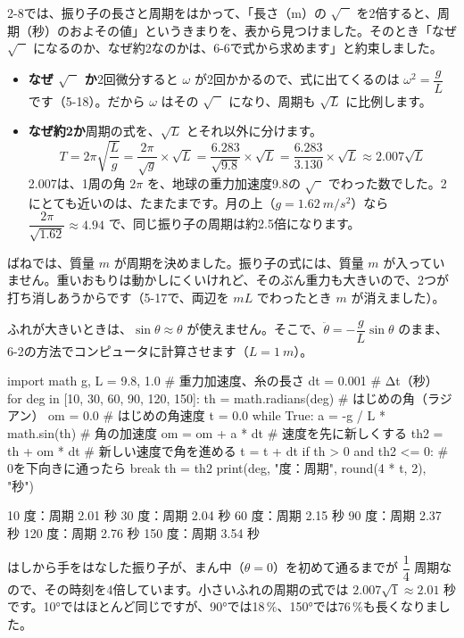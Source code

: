 2-8では、振り子の長さと周期をはかって、「長さ（m）の $\sqrt{\phantom{L}}$ を2倍すると、周期（秒）のおよその値」というきまりを、表から見つけました。そのとき「なぜ $\sqrt{\phantom{L}}$ になるのか、なぜ約2なのかは、6-6で式から求めます」と約束しました。
\begin{itemize}[leftmargin=1.2\zw, itemsep=2pt, topsep=2pt, label={\color{\bkTT}●}]
\item \textbf{なぜ $\sqrt{\phantom{L}}$ か}\quad 2回微分すると $\omega$ が2回かかるので、式に出てくるのは \mbox{$\omega^2=\dfrac{g}{L}$} です（5-18）。だから $\omega$ はその $\sqrt{\phantom{L}}$ になり、周期も $\sqrt{L}$ に比例します。
\item \textbf{なぜ約2か}\quad 周期の式を、$\sqrt{L}$ とそれ以外に分けます。
\[ T=2\pi\sqrt{\frac{L}{g}}=\frac{2\pi}{\sqrt{g}}\times\sqrt{L}=\frac{6.283}{\sqrt{9.8}}\times\sqrt{L}=\frac{6.283}{3.130}\times\sqrt{L}\approx2.007\sqrt{L} \]
2.007は、1周の角 $2\pi$ を、地球の重力加速度9.8の $\sqrt{\phantom{g}}$ でわった数でした。2にとても近いのは、たまたまです。月の上（$g=\qty{1.62}{m/s^2}$）なら $\dfrac{2\pi}{\sqrt{1.62}}\approx4.94$ で、同じ振り子の周期は約2.5倍になります。
\end{itemize}

ばねでは、質量 $m$ が周期を決めました。振り子の式には、質量 $m$ が入っていません。重いおもりは動かしにくいけれど、そのぶん重力も大きいので、2つが打ち消しあうからです（5-17で、両辺を $mL$ でわったとき $m$ が消えました）。

ふれが大きいときは、$\sin\theta\approx\theta$ が使えません。そこで、$\ddot\theta=-\dfrac{g}{L}\sin\theta$ のまま、6-2の方法でコンピュータに計算させます（$L=\qty{1}{m}$）。

\begin{bkcode}[Python]
import math
g, L = 9.8, 1.0            \# 重力加速度、糸の長さ
dt = 0.001                 \# Δt（秒）
for deg in [10, 30, 60, 90, 120, 150]:
    th = math.radians(deg)   \# はじめの角（ラジアン）
    om = 0.0                 \# はじめの角速度
    t = 0.0
    while True:
        a = -g / L * math.sin(th)    \# 角の加速度
        om = om + a * dt             \# 速度を先に新しくする
        th2 = th + om * dt           \# 新しい速度で角を進める
        t = t + dt
        if th > 0 and th2 <= 0:      \# 0を下向きに通ったら
            break
        th = th2
    print(deg, "度：周期", round(4 * t, 2), "秒")
\end{bkcode}
\begin{bkcodeout}[実行結果]
10 度：周期 2.01 秒
30 度：周期 2.04 秒
60 度：周期 2.15 秒
90 度：周期 2.37 秒
120 度：周期 2.76 秒
150 度：周期 3.54 秒
\end{bkcodeout}
はしから手をはなした振り子が、まん中（$\theta=0$）を初めて通るまでが $\dfrac{1}{4}$ 周期なので、その時刻を4倍しています。小さいふれの周期の式では $2.007\sqrt{1}\approx2.01$ 秒です。10°ではほとんど同じですが、90°では18\,\%、150°では76\,\%も長くなりました。

